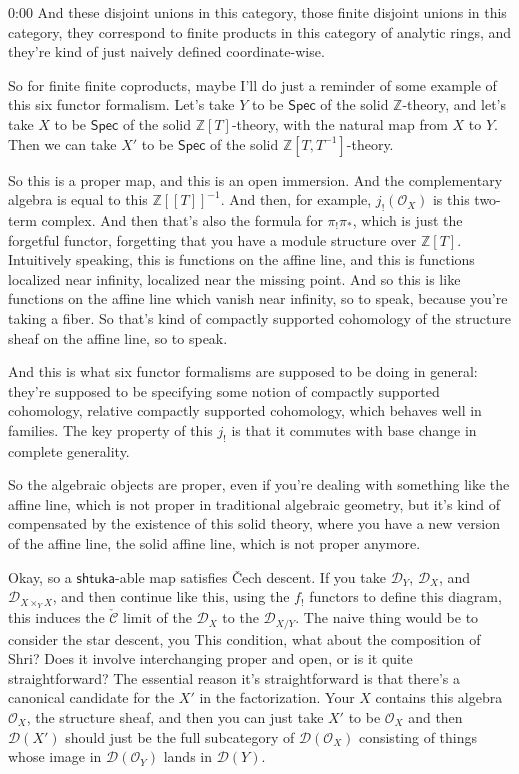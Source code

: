 \begin{unfinished}{0:00}
And these disjoint unions in this category, those finite disjoint unions in this category, they correspond to finite products in this category of analytic rings, and they're kind of just naively defined coordinate-wise.

So for finite finite coproducts, maybe I'll do just a reminder of some example of this six functor formalism. Let's take $Y$ to be $\mathsf{Spec}$ of the solid $\mathbb{Z}$-theory, and let's take $X$ to be $\mathsf{Spec}$ of the solid $\mathbb{Z}[T]$-theory, with the natural map from $X$ to $Y$. Then we can take $X'$ to be $\mathsf{Spec}$ of the solid $\mathbb{Z}[T, T^{-1}]$-theory. 

So this is a proper map, and this is an open immersion. And the complementary algebra is equal to this $\mathbb{Z}[[T]]^{-1}$. And then, for example, $j_! (\mathcal{O}_X)$ is this two-term complex. And then that's also the formula for $\pi_! \pi_*$, which is just the forgetful functor, forgetting that you have a module structure over $\mathbb{Z}[T]$. Intuitively speaking, this is functions on the affine line, and this is functions localized near infinity, localized near the missing point. And so this is like functions on the affine line which vanish near infinity, so to speak, because you're taking a fiber. So that's kind of compactly supported cohomology of the structure sheaf on the affine line, so to speak.

And this is what six functor formalisms are supposed to be doing in general: they're supposed to be specifying some notion of compactly supported cohomology, relative compactly supported cohomology, which behaves well in families. The key property of this $j_!$ is that it commutes with base change in complete generality.

So the algebraic objects are proper, even if you're dealing with something like the affine line, which is not proper in traditional algebraic geometry, but it's kind of compensated by the existence of this solid theory, where you have a new version of the affine line, the solid affine line, which is not proper anymore.

Okay, so a $\mathsf{shtuka}$-able map satisfies Čech descent. If you take $\mathcal{D}_Y$, $\mathcal{D}_X$, and $\mathcal{D}_{X \times_Y X}$, and then continue like this, using the $f_!$ functors to define this diagram, this induces the $\check{\mathcal{C}}$ limit of the $\mathcal{D}_X$ to the $\mathcal{D}_{X/Y}$. The naive thing would be to consider the star descent, you
This condition, what about the composition of Shri? Does it involve interchanging proper and open, or is it quite straightforward? The essential reason it's straightforward is that there's a canonical candidate for the $X'$ in the factorization. Your $X$ contains this algebra $\mathcal{O}_X$, the structure sheaf, and then you can just take $X'$ to be $\mathcal{O}_X$ and then $\mathcal{D}(X')$ should just be the full subcategory of $\mathcal{D}(\mathcal{O}_X)$ consisting of things whose image in $\mathcal{D}(\mathcal{O}_Y)$ lands in $\mathcal{D}(Y)$. 


\end{unfinished}
